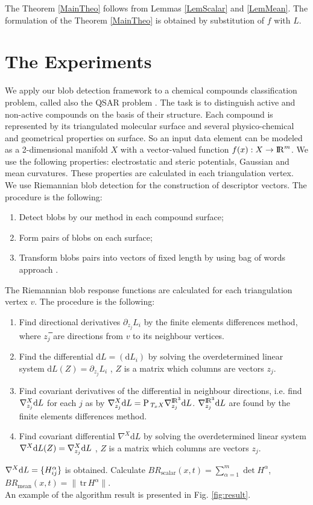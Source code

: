 \documentclass{llncs}
\newcommand{\Proj}{\mathrm{P}{\,}}
\newcommand{\partderiv}[2]{\partial_{#2} {#1}}
\newcommand{\CovariantDiffManif}[1]{\nabla^{#1}}
\newcommand{\CovariantDerivManif}[2]{\tensor*{\nabla}{^{#1}_{#2}}}
\newcommand{\Diff}{\mathrm{d}}
\newcommand{\FRScalar}{BR_{\mathrm{scalar}}}
\newcommand{\FRMean}{BR_{\mathrm{mean}}}
\newcommand {\tr}{{\,}\mathrm{tr}{\,}}
\begin{document}
The Theorem \ref{MainTheo} follows from Lemmas \ref{LemScalar} and \ref{LemMean}. The formulation of the Theorem \ref{MainTheo} is obtained by substitution of $f$ with $L$.

\section{The Experiments}
We apply our blob detection framework to a chemical compounds classification problem, called also the QSAR problem \cite{qsar}. The task is to distinguish active and non-active compounds on the basis of their structure. Each compound is represented by its triangulated molecular surface \cite{molecular} and several physico-chemical and geometrical properties on surface. So an input data element can be modeled as a 2-dimensional manifold $X$ with a vector-valued function $f(x):X \to {\rm I\!R}^m$. We use the following properties: electrostatic and steric potentials, Gaussian and mean curvatures. These properties are calculated in each triangulation vertex.
\\
We use Riemannian blob detection for the construction of descriptor vectors. The procedure is the following:
\begin{enumerate} 
\item Detect blobs by our method in each compound surface;
\item	Form pairs of blobs on each surface;
\item Transform blobs pairs into vectors of fixed length by using bag of words approach \cite{bag}.
\end{enumerate}
The Riemannian blob response functions are calculated for each triangulation vertex $v$. The procedure is the following:
\begin{enumerate} 
	\item Find directional derivatives $\partderiv{L_i}{z_j}$ by the finite elements differences method, where $z_j$̅ are directions from $v$ to its neighbour vertices. 
	\item Find the differential $\Diff L=(\Diff L_i)$ by solving the overdetermined linear system $\Diff L(Z)=\partderiv{L_i}{z_j}$ , $Z$  is a matrix which columns are vectors $z_j$.
	\item Find covariant derivatives of the differential in neighbour directions, i.e. find $\CovariantDerivManif{X}{z_j} \Diff L$ for each $j$ as by $\CovariantDerivManif{X}{z_j} \Diff L =\Proj_{T_xX} \CovariantDerivManif{\bbbr^3}{z_j} \Diff L$. $\CovariantDerivManif{\bbbr^3}{z_j} \Diff L$ are found by the finite elements differences method.
	\item Find covariant differential $\CovariantDiffManif{X} \Diff L$ by solving the overdetermined linear system 
	$\CovariantDiffManif{X} \Diff L(Z)=\CovariantDerivManif{X}{z_j} \Diff L$ , $Z$  is a matrix which columns are vectors $z_j$.
	\end{enumerate}
	$\CovariantDiffManif{X} \Diff L=\{\tensor*{H}{_i_j^\alpha} \}$ is obtained. Calculate $\FRScalar(x,t)=\sum_{\alpha=1}^{m}\det H^{\alpha}$,
	\\
	$\FRMean(x,t)=\|\tr H^{\alpha}\|$.	
\\
An example of the algorithm result is presented in Fig. \ref{fig:result}.
\end{document}

